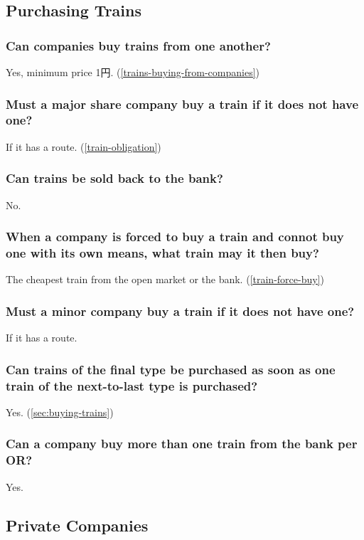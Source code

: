 \subsection{Purchasing Trains}

\subsubsection{Can companies buy trains from one another?}
Yes, minimum price 1円. (\autoref{trains-buying-from-companies})

\subsubsection{Must a major share company buy a train if it does not have one?}
If it has a route. (\autoref{train-obligation})

\subsubsection{Can trains be sold back to the bank?}
No.

\subsubsection{When a company is forced to buy a train and connot buy one
  with its own means, what train may it then buy?}
The cheapest train from the open market or the bank. (\autoref{train-force-buy})

\subsubsection{Must a minor company buy a train if it does not have one?}
If it has a route.

\subsubsection{Can trains of the final type be purchased as soon as one
  train of the next-to-last type is purchased?}
Yes. (\autoref{sec:buying-trains})

\subsubsection{Can a company buy more than one train from the bank per OR?}
Yes.

\subsection{Private Companies}

